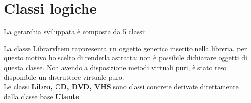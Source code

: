 \section{Classi logiche}{
	La gerarchia sviluppata è composta da 5 classi:
	
	La classe LibraryItem rappresenta un oggetto generico inserito nella libreria, per questo motivo ho scelto di renderla astratta: non è possibile dichiarare oggetti di questa classe. Non avendo a disposizione metodi virtuali puri, è stato reso disponibile un distruttore virtuale puro. \\
	Le classi  \textbf{Libro, CD, DVD, VHS} sono classi concrete derivate direttamente dalla classe base \textbf{Utente}.
}